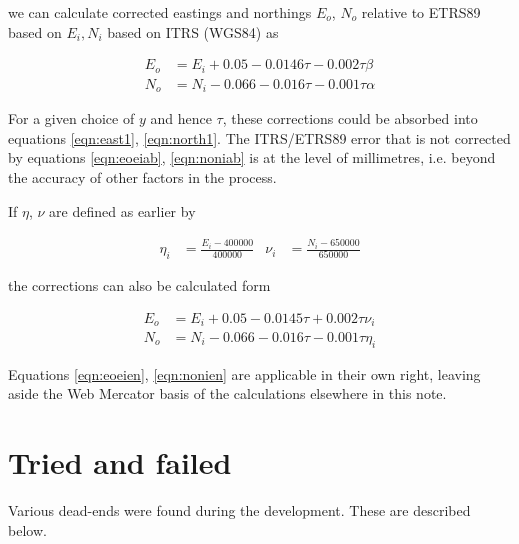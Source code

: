 \documentclass[10pt,a4paper]{article}
\begin{document}
we can calculate corrected eastings and northings $E_o$, $N_o$ relative to
ETRS89 based on $E_i, N_i$ based on ITRS (WGS84) as

\begin{align}
  E_o & = E_i + 0.05 - 0.0146\tau - 0.002\tau\beta \label{eqn:eoeiab} \\
  N_o & = N_i - 0.066 - 0.016\tau - 0.001\tau\alpha \label{eqn:noniab}
\end{align}

For a given choice of $y$ and hence $\tau$, these corrections could be absorbed
into equations \eqref{eqn:east1}, \eqref{eqn:north1}.  The ITRS/ETRS89 error
that is not corrected by equations \eqref{eqn:eoeiab}, \eqref{eqn:noniab} is at
the level of millimetres, i.e. beyond the accuracy of other factors in the
process.

If $\eta$, $\nu$ are defined as earlier by

\begin{align}
  \eta_i &= \frac{E_i - 400000}{400000} &
  \nu_i  &= \frac{N_i - 650000}{650000}
\end{align}

the corrections can also be calculated form

\begin{align}
  E_o & = E_i + 0.05 - 0.0145\tau + 0.002\tau\nu_i \label{eqn:eoeien} \\
  N_o & = N_i - 0.066 - 0.016\tau - 0.001\tau\eta_i \label{eqn:nonien}
\end{align}

Equations \eqref{eqn:eoeien}, \eqref{eqn:nonien} are applicable in their own
right, leaving aside the Web Mercator basis of the calculations elsewhere in
this note.

\section {Tried and failed}

Various dead-ends were found during the development.  These are described below.
\end{document}
